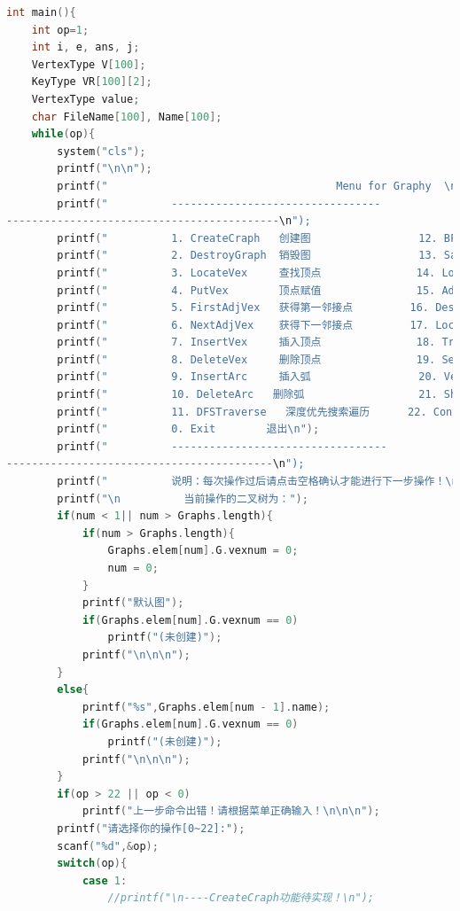 \documentclass[supercite]{Experimental_Report}
\theoremstyle{definition}
\begin{document}
\begin{lstlisting}[language=c]
int main(){
    int op=1;
    int i, e, ans, j; 
    VertexType V[100];
	KeyType VR[100][2]; 
    VertexType value;
    char FileName[100], Name[100];
    while(op){
        system("cls");
        printf("\n\n");
        printf("                                    Menu for Graphy  \n");
        printf("          ---------------------------------
-------------------------------------------\n");
        printf("    	  1. CreateCraph   创建图                 12. BFSTraverse     广度优先搜索遍历\n");
        printf("    	  2. DestroyGraph  销毁图                 13. SaveGraph       图文件保存\n");
        printf("    	  3. LocateVex     查找顶点               14. LoadGraph       图文件录入  \n");
        printf("    	  4. PutVex        顶点赋值               15. AddList         多图表添加  \n");
        printf("    	  5. FirstAdjVex   获得第一邻接点         16. DestroyList     多图表销毁    \n");
        printf("    	  6. NextAdjVex    获得下一邻接点         17. LocateList      多图表位置查找    \n");
        printf("          7. InsertVex     插入顶点               18. TraverseList    多图表遍历\n");
        printf("          8. DeleteVex     删除顶点               19. SelectList      图操作选择\n");
        printf("          9. InsertArc     插入弧                 20. VerticesSetLessThanK     距离小于k的顶点集合\n");
        printf("          10. DeleteArc   删除弧                  21. ShortestPathLength       顶点间最短路径和长度\n");
        printf("          11. DFSTraverse   深度优先搜索遍历      22. ConnectedComponentsNums  图的连通分量\n");
        printf("    	  0. Exit        退出\n");
        printf("          ----------------------------------
------------------------------------------\n");
        printf("          说明：每次操作过后请点击空格确认才能进行下一步操作！\n");
        printf("\n          当前操作的二叉树为：");
        if(num < 1|| num > Graphs.length){
            if(num > Graphs.length){
                Graphs.elem[num].G.vexnum = 0;
                num = 0;
            }
            printf("默认图");
            if(Graphs.elem[num].G.vexnum == 0)
                printf("(未创建)");
            printf("\n\n\n");
        }
        else{
        	printf("%s",Graphs.elem[num - 1].name);
        	if(Graphs.elem[num].G.vexnum == 0)
                printf("(未创建)");
            printf("\n\n\n");
		}   
        if(op > 22 || op < 0)
            printf("上一步命令出错！请根据菜单正确输入！\n\n\n");
        printf("请选择你的操作[0~22]:");
        scanf("%d",&op);
        switch(op){
            case 1:
                //printf("\n----CreateCraph功能待实现！\n");

\end{lstlisting}
\end{document}
